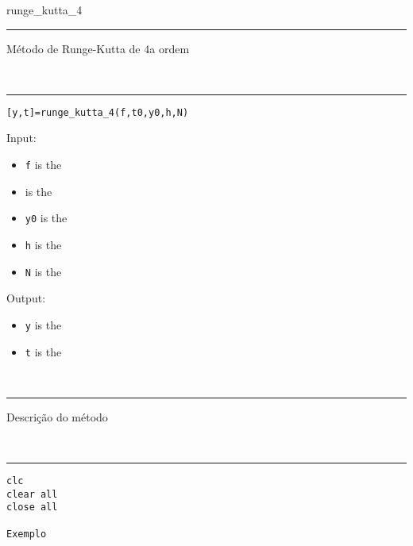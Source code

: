 \documentclass[12pt,a4paper]{article}%
\newcommand{\comando}[1]{{\Large #1} \\ \noindent\rule {17.9cm}{0.05cm}}
\newcommand{\parte}[1]{\vspace{1cm}{\large #1} \\ \noindent\rule {17.9cm}{0.05cm}}
\begin{document}
\comando{runge\_kutta\_4}

Método de Runge-Kutta de 4a ordem

\parte{Syntax}

\texttt{[y,t]=runge\_kutta\_4(f,t0,y0,h,N)}

Input:
\begin{itemize}
\item \texttt{f} is the 
\item {} is the 
\item \texttt{y0} is the 
\item \texttt{h} is the 
\item \texttt{N} is the 
\end{itemize}

Output:

\begin{itemize}
\item \texttt{y} is the 
\item \texttt{t} is the 
\end{itemize}


\parte{Description}

Descrição do método

\parte{Example}

\begin{verbatim}
clc
clear all
close all

Exemplo 

\end{verbatim}
\end{document}
